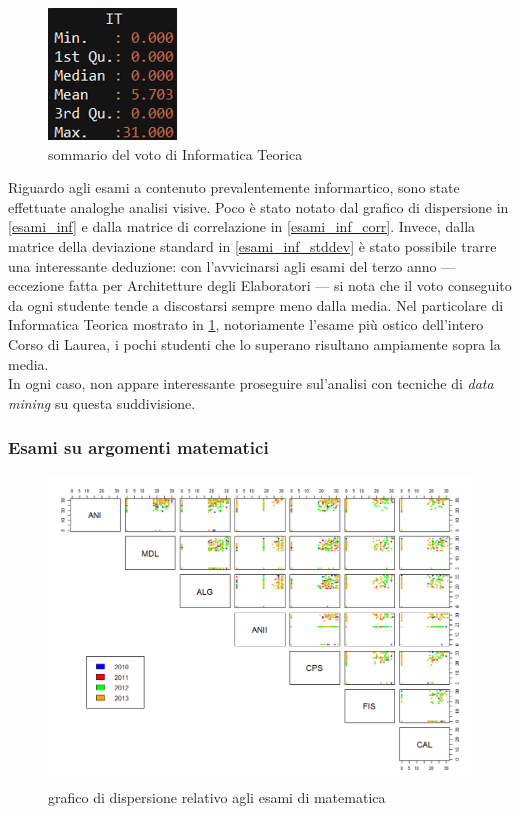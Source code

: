                 \begin{figure}
                    \centering
                    \caption{sommario del voto di Informatica Teorica}
                    \label{it}
                	\includegraphics[scale=0.8]{img/it.png}
                \end{figure}

                Riguardo agli esami a contenuto prevalentemente informartico, sono state effettuate analoghe analisi visive. Poco è stato notato dal grafico di dispersione in \ref{esami_inf} e dalla matrice di correlazione in \ref{esami_inf_corr}. Invece, dalla matrice della deviazione standard in \ref{esami_inf_stddev} è stato possibile trarre una interessante deduzione: con l’avvicinarsi agli esami del terzo anno –-- eccezione fatta per Architetture degli Elaboratori –-- si nota che il voto conseguito da ogni studente tende a discostarsi sempre meno dalla media. Nel particolare di Informatica Teorica mostrato in \ref{it}, notoriamente l'esame più ostico dell'intero Corso di Laurea, i pochi studenti che lo superano risultano ampiamente sopra la media. \\

                In ogni caso, non appare interessante proseguire sul'analisi con tecniche di \textit{data mining} su questa suddivisione.

            \subsubsection{Esami su argomenti matematici}

                \begin{figure}
                    \centering
                    \caption{grafico di dispersione relativo agli esami di matematica}
                    \label{esami_mat}
                	\includegraphics[scale=0.32]{img/scatter_plot_8_gen.png}
                \end{figure}

